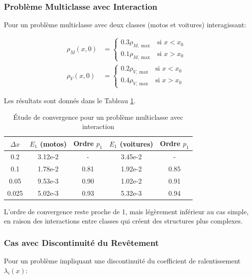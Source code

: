 \subsubsection{Problème Multiclasse avec Interaction}
\label{subsubsec:multiclasse_interaction}

Pour un problème multiclasse avec deux classes (motos et voitures) interagissant:

\begin{align}
\rho_M(x,0) &= 
\begin{cases}
0.3\rho_{M,\max} & \text{si } x < x_0\\
0.1\rho_{M,\max} & \text{si } x > x_0
\end{cases}\\
\rho_V(x,0) &= 
\begin{cases}
0.2\rho_{V,\max} & \text{si } x < x_0\\
0.4\rho_{V,\max} & \text{si } x > x_0
\end{cases}
\end{align}

Les résultats sont donnés dans le Tableau \ref{tab:conv_multiclasse}.

\begin{table}[htbp]
\centering
\caption{Étude de convergence pour un problème multiclasse avec interaction}
\label{tab:conv_multiclasse}
\begin{tabular}{ccccc}
\toprule
$\Delta x$ & $E_1$ (motos) & Ordre $p_1$ & $E_1$ (voitures) & Ordre $p_1$ \\
\midrule
0.2 & 3.12e-2 & - & 3.45e-2 & - \\
0.1 & 1.78e-2 & 0.81 & 1.92e-2 & 0.85 \\
0.05 & 9.53e-3 & 0.90 & 1.02e-2 & 0.91 \\
0.025 & 5.02e-3 & 0.93 & 5.32e-3 & 0.94 \\
\bottomrule
\end{tabular}
\end{table}

L'ordre de convergence reste proche de 1, mais légèrement inférieur au cas simple, en raison des interactions entre classes qui créent des structures plus complexes.

\subsubsection{Cas avec Discontinuité du Revêtement}
\label{subsubsec:discontinuite_revetement}

Pour un problème impliquant une discontinuité du coefficient de ralentissement $\lambda_i(x)$:

